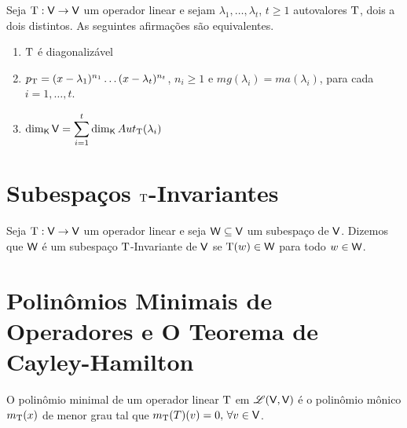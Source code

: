 \documentclass[10pt,a4paper]{book}
\begin{document}
\begin{theorem}
	Seja $\mathrm{ T } : \mathsf{ V } \rightarrow \mathsf{ V } $ um operador linear e sejam $\lambda_1, \dots, \lambda_t$, $t \geq 1$ autovalores $\mathrm{ T }$, dois a dois distintos. As seguintes afirmações são equivalentes.
	\begin{enumerate}
		\item $\mathrm{ T }$ é diagonalizável
		\item $p_{\mathrm{ T }} = (x - \lambda_1) ^ {n_1} \dots (x - \lambda_t) ^ {n_t}$, $n_i \geq 1$ e $mg(\lambda_i) = ma(\lambda_i)$, para cada $i = 1, \dots, t$.
		\item $\dim_{\mathsf{ K }} \mathsf{ V } = \displaystyle\sum_{i = 1}^{t} \dim_{\mathsf{ K }} Aut_{\mathrm{ T }}(\lambda_i)$
	\end{enumerate}
\end{theorem}



\section{Subespaços $\mathrm{ T }$-Invariantes}

\begin{definition}
	Seja $\mathrm{ T } : \mathsf{ V } \rightarrow \mathsf{ V } $ um operador linear e seja $\mathsf{ W } \subseteq \mathsf{ V }$ um subespaço de $\mathsf{ V }$. Dizemos que $\mathsf{ W }$ é um subespaço $\mathrm{ T }$-Invariante de $\mathsf{ V }$ se $\mathrm{ T }(w) \in \mathsf{ W }$ para todo $w \in \mathsf{ W }$.
\end{definition}




\section{Polinômios Minimais de Operadores e O Teorema de Cayley-Hamilton}

\begin{definition}
	O polinômio minimal de um operador linear $\mathrm{ T }$ em $\mathscr{ L }(\mathsf{ V }, \mathsf{ V })$ é o polinômio mônico $m_{\mathrm{ T }}(x)$ de menor grau tal que $m_{\mathrm{ T }}(T)(v) = 0,\, \forall v \in \mathsf{ V }$.
\end{definition}
\end{document}
